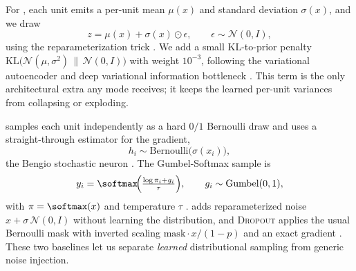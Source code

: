  For \gaussreparam, each unit emits a per-unit mean $\mu(x)$ and standard deviation $\sigma(x)$, and we draw
\begin{equation}
z = \mu(x) + \sigma(x) \odot \epsilon, \qquad \epsilon \sim \mathcal{N}(0, I),
\label{eq:gauss}
\end{equation}
using the reparameterization trick \citep{kingma2014vae}. We add a small KL-to-prior penalty $\mathrm{KL}\big(\mathcal{N}(\mu,\sigma^2)\,\|\,\mathcal{N}(0,I)\big)$ with weight $10^{-3}$, following the variational autoencoder and deep variational information bottleneck \citep{kingma2014vae,alemi2017deepvib}. This term is the only architectural extra any mode receives; it keeps the learned per-unit variances from collapsing or exploding.

 \bernoullist samples each unit independently as a hard $0/1$ Bernoulli draw and uses a straight-through estimator for the gradient,
\begin{equation}
h_i \sim \mathrm{Bernoulli}\big(\sigma(x_i)\big),
\label{eq:bern}
\end{equation}
\ie the Bengio stochastic neuron \citep{bengio2013stochastic}. The Gumbel-Softmax sample is
\begin{equation}
y_i = \softmax\!\Big(\tfrac{\log \pi_i + g_i}{\tau}\Big), \qquad g_i \sim \mathrm{Gumbel}(0,1),
\label{eq:gumbel}
\end{equation}
with $\pi = \softmax(x)$ and temperature $\tau$ \citep{jang2017gumbel,maddison2017concrete}. \gaussnoise adds reparameterized noise $x + \sigma\,\mathcal{N}(0,I)$ without learning the distribution, and \textsc{Dropout} applies the usual Bernoulli mask with inverted scaling $\text{mask}\cdot x/(1-p)$ and an exact gradient \citep{srivastava2014dropout,gal2016dropout}. These two baselines let us separate \emph{learned} distributional sampling from generic noise injection.

